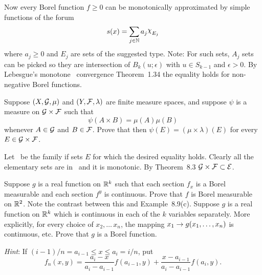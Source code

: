 \begin{enumerate}
Now every Borel function \(f\geq 0\) can be monotonically approximated
by simple functions of the forum
\begin{equation*}
s(x) = \sum_{j\in\N} a_j\chhi_{E_j}
\end{equation*}
where \(a_j\geq 0\) and \(E_j\) are sets of the suggested type.
Note: For such sets, \(A_j\) sets can be picked so they are intersection
of \(B_k(u;\epsilon)\) with \(u\in S_{k-1}\) and \(\epsilon>0\).
By Lebesgue's monotone~ convergence Theorem~1.34
the equality holds for non-negative Borel functions.


\begin{excopy}
Suppose \((X,\mathcal{G}, \mu)\)
and \((Y,\mathcal{F}, \lambda)\)
are finite measure spaces, and suppose \(\psi\) is a measure on
\(\mathcal{G}\times\mathcal{F}\) such that 
\begin{equation*}
\psi(A\times B) = \mu(A) \mu(B)
\end{equation*}
whenever \(A\in\mathcal{G}\) and \(B\in\mathcal{F}\).
Prove that then \(\psi(E) = (\mu\times\lambda)(E)\) 
for every \(E\in \mathcal{G}\times\mathcal{F}\).
\end{excopy}

Let \calE\ be the family if sets $E$ for which the desired equality holds.
Clearly all the elementary sets are in \calE\ and it is monotonic.
By Theorem~8.3  \(\mathcal{G}\times\mathcal{F} \subset \mathcal{E}\).


\begin{excopy}
\begin{itemize}
Suppose $g$ is a real function on \(\mathbb{R}^k\) such that each section \(f_x\)
is a Borel measurable and each section \(f^y\) is continuous.
Prove that $f$ is Borel measurable on \(\mathbb{R}^2\).
Note the contrast between this and Example~8.9(c).
Suppose $g$ is a real function on \(\mathbb{R}^k\) which is continuous in each 
of the $k$ variables separately.
More explicitly, for every choice of \(x_2,\ldots\,x_n\), the mapping
\(x_1 \to g(x_1,\ldots,x_{n})\) is continuous, etc.
Prove that $g$ is a Borel function.
\end{itemize}
\emph{Hint}: If \((i-1)/n = a_{i-1} \leq x \leq a_i = i/n\), put
\begin{equation*}
f_n(x,y) = 
\frac{a_i - x}{a_i - a_{i-1}} f(a_{i-1}, y) 
+
\frac{x - a_{i-1}}{a_i - a_{i-1}} f(a_i, y).
\end{equation*}
\end{excopy}


\end{enumerate}
